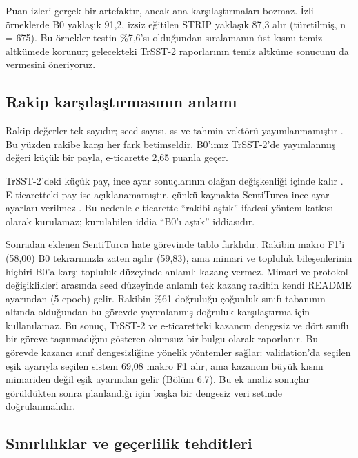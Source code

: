 \documentclass[11pt]{article}
\begin{document}
Puan izleri gerçek bir artefaktır, ancak ana karşılaştırmaları bozmaz. İzli örneklerde B0 yaklaşık 91,2, izsiz eğitilen STRIP yaklaşık 87,3 alır (türetilmiş, n = 675). Bu örnekler testin \%7,6'sı olduğundan sıralamanın üst kısmı temiz altkümede korunur; gelecekteki TrSST-2 raporlarının temiz altküme sonucunu da vermesini öneriyoruz.

\subsection{Rakip karşılaştırmasının anlamı}

Rakip değerler tek sayıdır; seed sayısı, ss ve tahmin vektörü yayımlanmamıştır \citep{altinok2025}. Bu yüzden rakibe karşı her fark betimseldir. B0'ımız TrSST-2'de yayımlanmış değeri küçük bir payla, e-ticarette 2,65 puanla geçer.

TrSST-2'deki küçük pay, ince ayar sonuçlarının olağan değişkenliği içinde kalır \citep{dodge2020}. E-ticaretteki pay ise açıklanamamıştır, çünkü kaynakta SentiTurca ince ayar ayarları verilmez \citep{altinok2025}. Bu nedenle e-ticarette ``rakibi aştık'' ifadesi yöntem katkısı olarak kurulamaz; kurulabilen iddia ``B0'ı aştık'' iddiasıdır.

Sonradan eklenen SentiTurca hate görevinde tablo farklıdır. Rakibin makro F1'i (58,00) B0 tekrarımızla zaten aşılır (59,83), ama mimari ve topluluk bileşenlerinin hiçbiri B0'a karşı topluluk düzeyinde anlamlı kazanç vermez. Mimari ve protokol değişiklikleri arasında seed düzeyinde anlamlı tek kazanç rakibin kendi README ayarından (5 epoch) gelir. Rakibin \%61 doğruluğu çoğunluk sınıfı tabanının altında olduğundan bu görevde yayımlanmış doğruluk karşılaştırma için kullanılamaz. Bu sonuç, TrSST-2 ve e-ticaretteki kazancın dengesiz ve dört sınıflı bir göreve taşınmadığını gösteren olumsuz bir bulgu olarak raporlanır. Bu görevde kazancı sınıf dengesizliğine yönelik yöntemler sağlar: validation'da seçilen eşik ayarıyla seçilen sistem 69,08 makro F1 alır, ama kazancın büyük kısmı mimariden değil eşik ayarından gelir (Bölüm 6.7). Bu ek analiz sonuçlar görüldükten sonra planlandığı için başka bir dengesiz veri setinde doğrulanmalıdır.

\subsection{Sınırlılıklar ve geçerlilik tehditleri}
\end{document}
